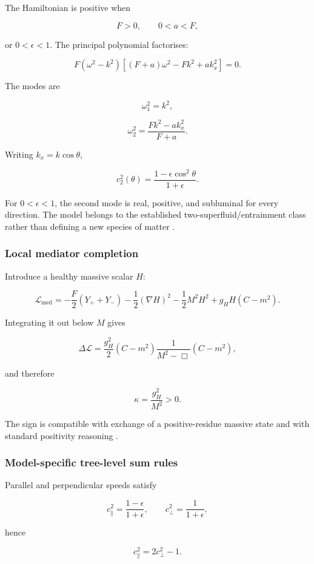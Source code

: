 \documentclass[
]{article}
\begin{document}
The Hamiltonian is positive when

\[
\boxed{F>0,\qquad0<a<F,}
\]

or \(0<\epsilon<1\). The principal polynomial factorises:

\[
F(\omega^2-k^2)
\left[(F+a)\omega^2-Fk^2+ak_x^2\right]=0.
\]

The modes are

\[
\omega_1^2=k^2,
\]

\[
\omega_2^2=\frac{Fk^2-ak_x^2}{F+a}.
\]

Writing \(k_x=k\cos\theta\),

\[
\boxed{
c_2^2(\theta)=\frac{1-\epsilon\cos^2\theta}{1+\epsilon}.
}
\]

For \(0<\epsilon<1\), the second mode is real, positive, and subluminal
for every direction. The model belongs to the established
two-superfluid/entrainment class rather than defining a new species of
matter .

\subsubsection{Local mediator
completion}\label{local-mediator-completion}

Introduce a healthy massive scalar \(H\):

\[
\mathcal L_{\mathrm{med}}
=-\frac F2(Y_++Y_-)
-\frac12(\nabla H)^2
-\frac12M^2H^2
+g_HH(C-m^2).
\]

Integrating it out below \(M\) gives

\[
\Delta\mathcal L
=\frac{g_H^2}{2}(C-m^2)\frac1{M^2-\Box}(C-m^2),
\]

and therefore

\[
\boxed{\kappa=\frac{g_H^2}{M^2}>0.}
\]

The sign is compatible with exchange of a positive-residue massive state
and with standard positivity reasoning
.

\subsubsection{Model-specific tree-level sum
rules}\label{model-specific-tree-level-sum-rules}

Parallel and perpendicular speeds satisfy

\[
c_\parallel^2=\frac{1-\epsilon}{1+\epsilon},
\qquad
c_\perp^2=\frac1{1+\epsilon},
\]

hence

\[
\boxed{c_\parallel^2=2c_\perp^2-1.}
\]
\end{document}
